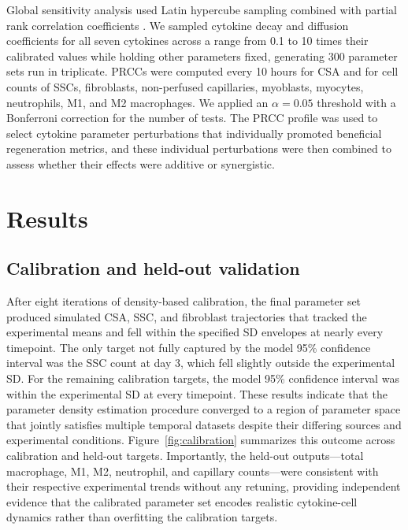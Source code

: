 \documentclass[10pt,letterpaper]{article}
\begin{document}
Global sensitivity analysis used Latin hypercube sampling combined with partial rank correlation coefficients \cite{marino2008sensitivity}. We sampled cytokine decay and diffusion coefficients for all seven cytokines across a range from 0.1 to 10 times their calibrated values while holding other parameters fixed, generating 300 parameter sets run in triplicate. PRCCs were computed every 10 hours for CSA and for cell counts of SSCs, fibroblasts, non-perfused capillaries, myoblasts, myocytes, neutrophils, M1, and M2 macrophages. We applied an $\alpha = 0.05$ threshold with a Bonferroni correction for the number of tests. The PRCC profile was used to select cytokine parameter perturbations that individually promoted beneficial regeneration metrics, and these individual perturbations were then combined to assess whether their effects were additive or synergistic.

\section{Results}
\label{sec:results}

\subsection{Calibration and held-out validation}

After eight iterations of density-based calibration, the final parameter set produced simulated CSA, SSC, and fibroblast trajectories that tracked the experimental means and fell within the specified SD envelopes at nearly every timepoint. The only target not fully captured by the model 95\% confidence interval was the SSC count at day 3, which fell slightly outside the experimental SD. For the remaining calibration targets, the model 95\% confidence interval was within the experimental SD at every timepoint. These results indicate that the parameter density estimation procedure converged to a region of parameter space that jointly satisfies multiple temporal datasets despite their differing sources and experimental conditions. Figure~\ref{fig:calibration} summarizes this outcome across calibration and held-out targets. Importantly, the held-out outputs---total macrophage, M1, M2, neutrophil, and capillary counts---were consistent with their respective experimental trends without any retuning, providing independent evidence that the calibrated parameter set encodes realistic cytokine-cell dynamics rather than overfitting the calibration targets.
\end{document}
